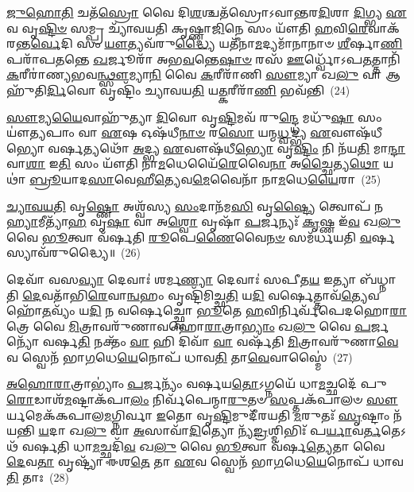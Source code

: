 \-\ul{𑌜𑍁}\-\-\ul{𑌹𑍋}\-\-\ul{𑌤𑌿} 𑌚𑌤᳴\-\ul{𑌸𑍍𑌰𑍋} 𑌵𑍈 𑌦𑌿\-\ul{𑌶}\-𑌶𑍍𑌚𑌤᳴𑌸𑍍𑌰𑍋\-𑌽𑌵𑌾𑌨𑍍𑌤𑌰\-\ul{𑌦𑌿}\-𑌶𑌾 \ul{𑌦𑌿}\-𑌗𑍍𑌭𑍍𑌯 \ul{𑌏}\-𑌵 𑌵𑍃\-\ul{𑌷𑍍𑌟𑌿}\-\-\ul{𑍞} 𑌸𑌮𑍍𑌪𑍍𑌰 𑌚𑍍𑌯𑌾᳴𑌵𑌯𑌤𑌿 𑌕𑍃𑌷𑍍𑌣𑌾\-\ul{𑌜𑌿}\-𑌨𑍇 𑌸𑌂 𑌯𑍗᳴𑌤𑌿 \ul{𑌹}\-𑌵𑌿\-\ul{𑌰𑍇}\-𑌵𑌾𑌕᳴𑌰𑌨𑍍𑌤\-\ul{𑌰𑍍𑌵𑍇}\-𑌦𑌿 𑌸𑌂 \ul{𑌯𑍗}\-𑌤𑍍𑌯𑌵᳴𑌰𑍁\-\ul{𑌦𑍍𑌧𑍍𑌯𑍈} 𑌯𑌤𑍀᳴𑌨𑌾\-\ul{𑌮}\-𑌦𑍍𑌯𑌮𑌾᳴𑌨𑌾𑌨𑌾𑍞 \ul{𑌶𑍀}\-𑌰𑍍\mbox{}𑌷𑌾\-\ul{𑌣𑌿} 𑌪𑌰𑌾᳴𑌪\-\ul{𑌤}\-𑌨𑍍𑌤𑍇 \ul{𑌖}\-𑌰𑍍𑌜𑍂𑌰𑌾᳴ 𑌅𑌭\-\ul{𑌵}\-𑌨𑍍𑌤𑍇\-\ul{𑌷𑌾}\-\-\ul{𑍞} 𑌰𑌸᳴ \ul{𑌊}\-𑌰𑍍𑌧𑍍𑌵𑍋᳴\-𑌽𑌪\-\ul{𑌤}\-𑌤𑍍𑌤𑌾𑌨𑌿᳴ \ul{𑌕}\-𑌰𑍀𑌰𑌾॑𑌣𑍍𑌯𑌭𑌵\-\ul{𑌨𑍍𑌥𑍍𑌸𑍗}\-𑌮𑍍𑌯𑌾\-\ul{𑌨𑌿} 𑌵𑍈 \ul{𑌕}\-𑌰𑍀𑌰𑌾᳴𑌣𑌿 \ul{𑌸𑍗}\-𑌮𑍍𑌯𑌾 𑌖\-\ul{𑌲𑍁} 𑌵𑌾 𑌆𑌹𑍁᳴𑌤𑌿\-\ul{𑌰𑍍𑌦𑌿}\-𑌵𑍋 𑌵𑍃𑌷𑍍𑌟𑌿𑌂᳴ 𑌚𑍍𑌯𑌾𑌵𑌯\-\ul{𑌤𑌿} 𑌯\-\ul{𑌤𑍍𑌕}\-𑌰𑍀𑌰𑌾᳴\-\ul{𑌣𑌿} 𑌭𑌵᳴𑌨𑍍𑌤𑌿~(24)

\-\ul{𑌸𑍗}\-𑌮𑍍𑌯\-\ul{𑌯𑍈}\-𑌵𑌾𑌹𑍁᳴𑌤𑍍𑌯𑌾 \ul{𑌦𑌿}\-𑌵𑍋 𑌵𑍃\-\ul{𑌷𑍍𑌟𑌿}\-𑌮𑌵᳴ 𑌰𑍁\-\ul{𑌨𑍍𑌦𑍍𑌧𑍇} 𑌮𑌧𑍁᳴\-\ul{𑌷𑌾} 𑌸𑌂 𑌯𑍗॑\-\ul{𑌤𑍍𑌯}\-𑌪𑌾𑌂 𑌵𑌾 \ul{𑌏}\-𑌷 𑌓𑌷᳴𑌧𑍀\-\ul{𑌨𑌾}\-\-\ul{𑍞} 𑌰\-\ul{𑌸𑍋} 𑌯𑌨𑍍𑌮\-\ul{𑌧𑍍𑌵}\-𑌦𑍍𑌭𑍍𑌯 \ul{𑌏}\-𑌵𑍗𑌷᳴𑌧𑍀𑌭𑍍𑌯𑍋 𑌵𑌰𑍍\mbox{}\-\ul{𑌷}\-𑌤𑍍𑌯𑌥𑍋᳴ \ul{𑌅}\-𑌦𑍍𑌭𑍍𑌯 \ul{𑌏}\-𑌵𑍗𑌷᳴𑌧𑍀\-\ul{𑌭𑍍𑌯𑍋} 𑌵𑍃\-\ul{𑌷𑍍𑌟𑌿𑌂} 𑌨𑌿 𑌨᳴𑌯\-\ul{𑌤𑌿} 𑌮𑌾\-\ul{𑌨𑍍𑌦𑌾} 𑌵𑌾\-\ul{𑌶𑌾} 𑌇\-\ul{𑌤𑌿} 𑌸𑌂 𑌯𑍗᳴𑌤𑌿 𑌨𑌾\-\ul{𑌮}\-𑌧𑍇𑌯𑍈᳴\-\ul{𑌰𑍇}\-𑌵𑍈\-\ul{𑌨𑌾} 𑌅\-\ul{𑌚𑍍𑌛𑍈}\-𑌤𑍍𑌯\-\ul{𑌥𑍋} 𑌯𑌥𑌾॑ \ul{𑌬𑍍𑌰𑍂}\-𑌯𑌾𑌦\-\ul{𑌸𑌾}\-𑌵𑍇𑌹𑍀\-\ul{𑌤𑍍𑌯𑍇}\-𑌵\-\ul{𑌮𑍇}\-𑌵𑍈𑌨𑌾᳴ 𑌨𑌾\-\ul{𑌮}\-𑌧𑍇\-\ul{𑌯𑍈}\-𑌰𑌾~(25)

\-\ul{𑌚𑍍𑌯𑌾}\-\-\ul{𑌵}\-\-\ul{𑌯}\-\-\ul{𑌤𑌿} 𑌵𑍃\-\ul{𑌷𑍍𑌣𑍋} 𑌅𑌶𑍍𑌵᳴𑌸𑍍𑌯 \ul{𑌸𑌂}\-𑌦𑌾𑌨᳴𑌮\-\ul{𑌸𑌿} 𑌵𑍃\-\ul{𑌷𑍍𑌟𑍍𑌯𑍈} 𑌤𑍍𑌵𑍋𑌪᳴ 𑌨\-\ul{𑌹𑍍𑌯𑌾}\-𑌮𑍀𑌤𑍍𑌯𑌾᳴\-\ul{𑌹} 𑌵𑍃\-\ul{𑌷𑌾} 𑌵𑌾 𑌅\-\ul{𑌶𑍍𑌵𑍋} 𑌵𑍃𑌷𑌾᳴ \ul{𑌪}\-𑌰𑍍𑌜𑌨𑍍𑌯𑌃᳴ \ul{𑌕𑍃}\-𑌷𑍍𑌣 𑌇᳴\-\ul{𑌵} 𑌖\-\ul{𑌲𑍁} 𑌵𑍈 \ul{𑌭𑍂}\-𑌤𑍍𑌵𑌾 𑌵᳴𑌰𑍍\mbox{}𑌷𑌤𑌿 \ul{𑌰𑍂}\-𑌪𑍇\-\ul{𑌣𑍈}\-𑌵𑍈\-\ul{𑌨}\-\-\ul{𑍞} 𑌸𑌮᳴𑌰𑍍𑌧𑌯𑌤𑌿 \ul{𑌵}\-𑌰𑍍\mbox{}𑌷𑌸𑍍𑌯𑌾𑌵᳴𑌰𑍁𑌦𑍍𑌧𑍍𑌯𑍈॥~(26)

{\anuvakamend[{\-\ul{𑌅}\-𑌷𑍍𑌟𑍗 𑌭𑌵᳴𑌨𑍍𑌤𑌿 𑌨𑌾\-\ul{𑌮}\-𑌧𑍇\-\ul{𑌯𑍈}\-𑌰𑍈\-\ul{𑌕𑌾}\-𑌨𑍍𑌨\-\ul{𑌤𑍍𑌰𑌿}\-\-\ul{𑍞}\-𑌶𑌚𑍍𑌚᳴}]}%

𑌦𑍇𑌵𑌾᳴ 𑌵𑌸\-\ul{𑌵𑍍𑌯𑌾} 𑌦𑍇𑌵𑌾𑌃॑ 𑌶𑌰𑍍𑌮\-\ul{𑌣𑍍𑌯𑌾} 𑌦𑍇𑌵𑌾𑌃॑ 𑌸𑌪𑍀𑌤\-\ul{𑌯} 𑌇𑌤𑍍𑌯𑌾 𑌬᳴𑌧𑍍𑌨𑌾𑌤𑌿 \ul{𑌦𑍇}\-𑌵𑌤𑌾᳴𑌭𑌿\-\ul{𑌰𑍇}\-𑌵𑌾\-\ul{𑌨𑍍𑌵}\-𑌹𑌂 𑌵𑍃𑌷𑍍𑌟𑌿᳴𑌮𑌿𑌚𑍍𑌛\-\ul{𑌤𑌿} 𑌯\-\ul{𑌦𑌿} 𑌵𑌰𑍍\mbox{}\-\ul{𑌷𑍇}\-𑌤𑍍𑌤𑌾𑌵᳴\-\ul{𑌤𑍍𑌯𑍇}\-𑌵 𑌹𑍋᳴\-\ul{𑌤}\-𑌵𑍍𑌯𑌂᳴ 𑌯\-\ul{𑌦𑌿} 𑌨 𑌵𑌰𑍍\mbox{}\-\ul{𑌷𑍇}\-𑌚𑍍𑌛𑍍𑌵𑍋 \ul{𑌭𑍂}\-𑌤𑍇 \ul{𑌹}\-𑌵𑌿𑌰𑍍𑌨𑌿𑌰𑍍𑌵᳴𑌪𑍇𑌦𑌹𑍋\-\ul{𑌰𑌾}\-𑌤𑍍𑌰𑍇 𑌵𑍈 \ul{𑌮𑌿}\-𑌤𑍍𑌰𑌾𑌵𑌰𑍁᳴𑌣𑌾𑌵𑌹𑍋\-\ul{𑌰𑌾}\-𑌤𑍍𑌰𑌾\-\ul{𑌭𑍍𑌯𑌾𑌂} 𑌖\-\ul{𑌲𑍁} 𑌵𑍈 \ul{𑌪}\-𑌰𑍍𑌜𑌨𑍍𑌯𑍋᳴ 𑌵𑌰𑍍\mbox{}𑌷\-\ul{𑌤𑌿} 𑌨𑌕𑍍𑌤𑌂᳴ \ul{𑌵𑌾} 𑌹𑌿 𑌦𑌿𑌵𑌾᳴ \ul{𑌵𑌾} 𑌵𑌰𑍍\mbox{}𑌷᳴𑌤𑌿 \ul{𑌮𑌿}\-𑌤𑍍𑌰𑌾𑌵𑌰𑍁᳴𑌣𑌾\-\ul{𑌵𑍇}\-𑌵 𑌸𑍍𑌵𑍇𑌨᳴ 𑌭𑌾\-\ul{𑌗}\-𑌧𑍇\-\ul{𑌯𑍇}\-𑌨𑍋𑌪᳴ 𑌧𑌾𑌵\-\ul{𑌤𑌿} 𑌤𑌾\-\ul{𑌵𑍇}\-𑌵𑌾𑌸𑍍𑌮𑍈॑~(27)

\-\ul{𑌅}\-\-\ul{𑌹𑍋}\-\-\ul{𑌰𑌾}\-𑌤𑍍𑌰𑌾\-𑌭𑍍𑌯𑌾𑌂॑ \ul{𑌪}\-𑌰𑍍𑌜𑌨𑍍𑌯𑌂᳴ 𑌵𑌰𑍍\mbox{}𑌷𑌯\-\ul{𑌤𑍋}\-\-𑌽𑌗𑍍𑌨𑌯𑍇᳴ 𑌧𑌾\-\ul{𑌮}\-𑌚𑍍𑌛𑌦𑍇᳴ 𑌪𑍁\-\ul{𑌰𑍋}\-𑌡𑌾𑌶᳴\-\-\ul{𑌮}\-𑌷𑍍𑌟𑌾\-𑌕᳴𑌪𑌾\-\ul{𑌲𑌂} 𑌨𑌿𑌰𑍍𑌵᳴𑌪𑍇𑌨𑍍𑌮𑌾\-\ul{𑌰𑍁}\-𑌤𑍞 \ul{𑌸}\-𑌪𑍍𑌤𑌕᳴𑌪𑌾𑌲𑍞 \ul{𑌸𑍗}\-𑌰𑍍𑌯𑌮𑍇𑌕᳴𑌕𑌪𑌾𑌲\-\ul{𑌮}\-𑌗𑍍𑌨𑌿𑌰𑍍𑌵𑌾 \ul{𑌇}\-𑌤𑍋 𑌵𑍃\-\ul{𑌷𑍍𑌟𑌿}\-𑌮𑍁𑌦𑍀᳴𑌰𑌯𑌤𑌿 \ul{𑌮}\-𑌰𑍁𑌤𑌃᳴ \ul{𑌸𑍃}\-𑌷𑍍𑌟𑌾𑌂 𑌨᳴𑌯𑌨𑍍𑌤𑌿 \ul{𑌯}\-𑌦𑌾 𑌖\-\ul{𑌲𑍁} 𑌵𑌾 \ul{𑌅}\-𑌸𑌾𑌵𑌾᳴\-\ul{𑌦𑌿}\-𑌤𑍍𑌯𑍋 𑌨𑍍𑌯᳴\-\ul{𑌙𑍍𑌰}\-𑌶𑍍𑌮𑌿𑌭𑌿𑌃᳴ 𑌪\-\ul{𑌰𑍍𑌯𑌾}\-𑌵\-\ul{𑌰𑍍𑌤}\-𑌤𑍇\-𑌽𑌥᳴ 𑌵𑌰𑍍\mbox{}𑌷𑌤𑌿 𑌧𑌾\-\ul{𑌮}\-𑌚𑍍𑌛𑌦𑌿᳴\-\ul{𑌵} 𑌖\-\ul{𑌲𑍁} 𑌵𑍈 \ul{𑌭𑍂}\-𑌤𑍍𑌵𑌾 𑌵᳴𑌰𑍍\mbox{}𑌷\-\ul{𑌤𑍍𑌯𑍇}\-𑌤𑌾 𑌵𑍈 \ul{𑌦𑍇}\-𑌵\-\ul{𑌤𑌾} 𑌵𑍃𑌷𑍍𑌟𑍍𑌯𑌾᳴ 𑌈𑌶\-\ul{𑌤𑍇} 𑌤𑌾 \ul{𑌏}\-𑌵 𑌸𑍍𑌵𑍇𑌨᳴ 𑌭𑌾\-\ul{𑌗}\-𑌧𑍇\-\ul{𑌯𑍇}\-𑌨𑍋𑌪᳴ 𑌧𑌾𑌵\-\ul{𑌤𑌿} 𑌤𑌾𑌃~(28)

